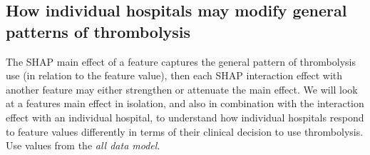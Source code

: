 

\subsection{How individual hospitals may modify general patterns of thrombolysis}

The SHAP main effect of a feature captures the general pattern of thrombolysis use (in relation to the feature value), then each SHAP interaction effect with another feature may either strengthen or attenuate the main effect. We will look at a features main effect in isolation, and also in combination with the interaction effect with an individual hospital, to understand how individual hospitals respond to feature values differently in terms of their clinical decision to use thrombolysis. Use values from the \emph{all data model}.




